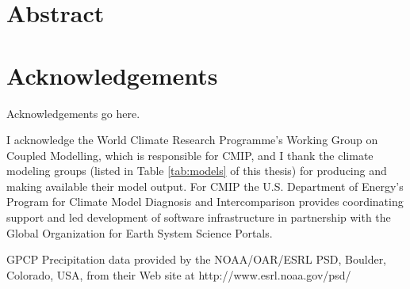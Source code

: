 
\chapter*{\centering \Large \vspace{-20mm}\Huge Abstract}
\thispagestyle{headings}


\chapter*{\centering \Large \vspace{-20mm}\Huge Acknowledgements}
\thispagestyle{headings}

Acknowledgements go here.


I acknowledge the World Climate Research Programme's Working Group on Coupled Modelling, which is responsible for CMIP, and I thank the climate modeling groups (listed in Table \ref{tab:models} of this thesis) for producing and making available their model output. For CMIP the U.S. Department of Energy's Program for Climate Model Diagnosis and Intercomparison provides coordinating support and led development of software infrastructure in partnership with the Global Organization for Earth System Science Portals.

GPCP Precipitation data provided by the NOAA/OAR/ESRL PSD, Boulder, Colorado, USA, from their Web site at http://www.esrl.noaa.gov/psd/


\vspace{2cm}


\newpage
\thispagestyle{empty}

\tableofcontents

